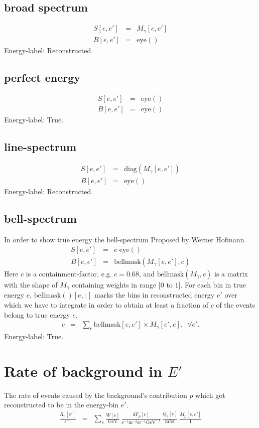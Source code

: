 \documentclass{article}%
\begin{document}
\subsection{broad spectrum}
\begin{eqnarray}
S[e, e'] &=& M_{\gamma}[e, e']
\\
B[e, e'] &=& \mathrm{eye}()
\end{eqnarray}
%
Energy-label: Reconstructed.
%
\subsection{perfect energy}
\begin{eqnarray}
S[e, e'] &=& \mathrm{eye}()
\\
B[e, e'] &=& \mathrm{eye}()
\end{eqnarray}
%
Energy-label: True.
%
\subsection{line-spectrum}
\begin{eqnarray}
S[e, e'] &=& \mathrm{diag}(M_{\gamma}[e, e'])
\\
B[e, e'] &=& \mathrm{eye}()
\end{eqnarray}
%
Energy-label: Reconstructed.
%
\subsection{bell-spectrum}
%
In order to show true energy the bell-spectrum
%
Proposed by Werner Hofmann.
\begin{eqnarray}
S[e, e'] &=& c \, \, \mathrm{eye}()
\\
B[e, e'] &=& \mathrm{bellmask}(M_{\gamma}[e, e'], c)
\end{eqnarray}
%
Here $c$ is a containment-factor, e.g. $c = 0.68$,
%
and $\mathrm{bellmask}(M_{\gamma}, c)$ is a matrix with the shape of $M_{\gamma}$ containing weights in range $[0$ to $1]$.
%
For each bin in true energy $e$, $\mathrm{bellmask}()[e, :]$ marks the bins in reconstructed energy $e'$ over which we have to integrate in order to obtain at least a fraction of $c$ of the events belong to true energy $e$.
%
\begin{eqnarray}
c &=& \sum_e \mathrm{bellmask}[e ,e'] \times M_{\gamma}[e', e], \, \, \, \forall e'.
\end{eqnarray}
%
Energy-label: True.
%
\section{Rate of background in $E'$}
%
The rate of events caused by the background's contribution $p$ which got reconstructed to be in the energy-bin $e'$.
%
\begin{eqnarray}
\frac{R_p[e']}{\text{s}^{-1}}
&=&
\sum_{e}
\frac{W[e]}{\text{GeV}} \,
\frac{dF_p[e]}{\text{s}^{-1}\text{m}^{-2}\text{sr}^{-1}\text{GeV}^{-1}} \,
\frac{Q_p[e]}{\text{m}^2\text{sr}} \,
\frac{M_p[e, e']}{1}
\end{eqnarray}
%
\end{document}
